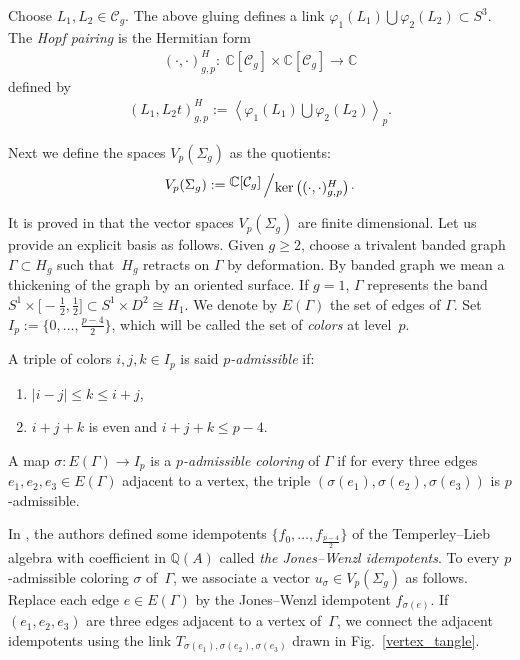 \documentclass[11pt]{article}
\newcommand{\quotient}[2]{{\raisebox{.2em}{$#1$}\left/\raisebox{-.2em}{$#2$}\right.}}
\numberwithin{equation}{section}
\begin{document}
Choose $L_1,L_2\in \mathcal{C}_g$. The above gluing defines a link $\varphi_1(L_1)\bigcup \varphi_2(L_2) \subset S^3$. The \textit{Hopf pairing} is the Hermitian form
\begin{gather*} ( \cdot , \cdot )_{g,p}^H \colon \ \mathbb{C}[\mathcal{C}_g]\times \mathbb{C}[\mathcal{C}_g] \rightarrow \mathbb{C}\end{gather*}
defined by \begin{gather*} ( L_1, L_2 t)_{g,p}^H := \left\langle \varphi_1(L_1)\bigcup \varphi_2(L_2) \right\rangle_p.\end{gather*}

Next we define the spaces $V_{p}(\Sigma_g)$ as the quotients:
\begin{gather*} V_{p}(\Sigma_g) := \quotient{ \mathbb{C}[\mathcal{C}_g]}{\ker \big(( \cdot , \cdot )_{g,p}^H \big)}.\end{gather*}

 It is proved in \cite{BHMV2} that the vector spaces $V_{p}(\Sigma_g)$ are finite dimensional. Let us provide an explicit basis as follows. Given $g\geq 2$, choose a trivalent banded graph $\Gamma \subset H_g$ such that~$H_g$ retracts on $\Gamma$ by deformation. By banded graph we mean a thickening of the graph by an oriented surface. If $g=1$, $\Gamma $ represents the band $S^1\times \big[{-}\frac{1}{2}, \frac{1}{2}\big] \subset S^1\times D^2 \cong H_1$. We denote by $E(\Gamma)$ the set of edges of $\Gamma$. Set $I_p:=\big\{0, \ldots, \frac{p-4}{2}\big\}$, which will be called the set of \textit{colors} at level~$p$.

A triple of colors $i,j,k \in I_p$ is said \textit{$p$-admissible} if:
\begin{enumerate}\itemsep=0pt
\item[1)] $|i-j|\leq k \leq i+j$,
\item[2)] $i+j+k$ is even and $i+j+k\leq p-4$.
\end{enumerate}

A map $\sigma \colon E(\Gamma) \rightarrow I_p$ is a \textit{$p$-admissible coloring} of $\Gamma$ if for every three edges $e_1,e_2,e_3\in E(\Gamma)$ adjacent to a vertex, the triple $(\sigma(e_1),\sigma(e_2),\sigma(e_3))$ is $p$-admissible.

In \cite{Jones_proj, Wenzl}, the authors defined some idempotents $\big\{ f_0, \ldots, f_{\frac{p-4}{2}} \big\}$ of the Temperley--Lieb algebra with coefficient in $\mathbb{Q}(A)$ called \textit{the Jones--Wenzl idempotents}. To every $p$-admissible coloring $\sigma$ of~$\Gamma$, we associate a vector $u_{\sigma}\in V_{p}(\Sigma_g)$ as follows. Replace each edge $e\in E(\Gamma)$ by the Jones--Wenzl idempotent $f_{\sigma(e)}$. If $(e_1,e_2,e_3)$ are three edges adjacent to a vertex of~$\Gamma$, we connect the adjacent idempotents using the link $T_{\sigma(e_1),\sigma(e_2),\sigma(e_3)}$ drawn in Fig.~\ref{vertex_tangle}.
\end{document}
